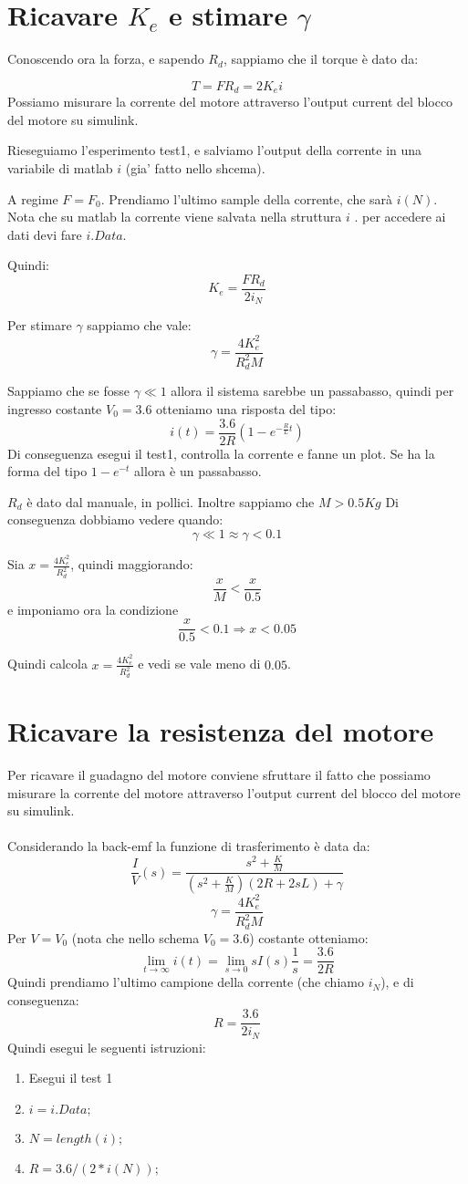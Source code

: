 \documentclass[10pt,a4paper]{article}
\begin{document}
\section{Ricavare $K_e$ e stimare $\gamma$}
Conoscendo ora la forza, e sapendo $R_d$, sappiamo che il torque è dato da:

$$T = FR_d = 2K_e i$$
Possiamo misurare la corrente del motore attraverso l'output current del blocco del motore su simulink.

Rieseguiamo l'esperimento test1, e salviamo l'output della corrente in una variabile di matlab $i$ (gia' fatto nello shcema).

A regime $F=F_0$. Prendiamo l'ultimo sample della corrente, che sarà $i(N)$. Nota che su matlab la corrente viene salvata nella struttura $i$ . per accedere ai dati devi fare $i.Data$.

 Quindi:
$$K_e = \frac{FR_d}{2i_N}$$

Per stimare $\gamma$ sappiamo che vale:
$$\gamma = \frac{4K_e^2}{R_d^2M}$$

Sappiamo che se fosse $\gamma \ll 1$ allora il sistema sarebbe un passabasso, quindi per ingresso costante $V_0=3.6$ otteniamo una risposta del tipo:
$$i(t) = \frac{3.6}{2R}(1-e^{-\frac{R}{L}t})$$
Di conseguenza esegui il test1, controlla la corrente e fanne un plot. Se ha la forma del tipo $1-e^{-t}$ allora è un passabasso.

$R_d$ è dato dal manuale, in pollici. Inoltre sappiamo che $M > 0.5Kg$
Di conseguenza dobbiamo vedere quando:
$$\gamma \ll 1 \approx \gamma < 0.1$$

Sia $ x= \frac{4K_e^2}{R_d^2}$, quindi maggiorando:
$$ \frac{x}{M} < \frac{x}{0.5}$$
e imponiamo ora la condizione
$$\frac{x}{0.5}<0.1 \Rightarrow x < 0.05$$

Quindi calcola $ x= \frac{4K_e^2}{R_d^2}$ e vedi se vale meno di $0.05$.

\newpage
\section{Ricavare la resistenza del motore}
Per ricavare il guadagno del motore conviene sfruttare il fatto che possiamo misurare la corrente del motore attraverso l'output current del blocco del motore su simulink. \\ \\
Considerando la back-emf la funzione di trasferimento è data da:
$$\frac{I}{V}(s) = \frac{s^2+\frac{K}{M}}{(s^2+\frac{K}{M})(2R+2sL)+\gamma }$$
$$\gamma = \frac{4K_e^2}{R_d^2M}$$
Per $V=V_0$ (nota che nello schema $V_0=3.6$) costante otteniamo:
$$\lim_{t \to \infty} i(t) = \lim_{s \to 0} sI(s)\frac{1}{s} = \frac{3.6}{2R}$$
Quindi prendiamo l'ultimo campione della corrente (che chiamo $i_N$), e di conseguenza:
$$R = \frac{3.6}{2i_N}$$
Quindi esegui le seguenti istruzioni:
\begin{enumerate}
\item Esegui il test 1
\item $i=i.Data;$
\item $N=length(i);$
\item $ R = 3.6/(2*i(N));$
\end{enumerate}
\end{document}
